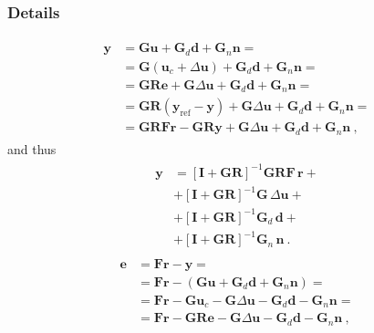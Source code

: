 \documentclass[letterpaper,10pt,english]{jupyterBook}
\begin{document}
\subsubsection*{Details}

\sphinxAtStartPar
{}
\begin{equation*}
\begin{split}\begin{aligned}
  \mathbf{y}
  & = \mathbf{G} \mathbf{u} + \mathbf{G}_d \mathbf{d} + \mathbf{G}_n \mathbf{n} = \\
  & = \mathbf{G} \left( \mathbf{u}_c + \Delta \mathbf{u} \right) + \mathbf{G}_d \mathbf{d} + \mathbf{G}_n \mathbf{n} = \\
  & = \mathbf{G} \mathbf{R} \mathbf{e} + \mathbf{G} \Delta \mathbf{u} + \mathbf{G}_d \mathbf{d} + \mathbf{G}_n \mathbf{n} = \\
  & = \mathbf{G} \mathbf{R} \left( \mathbf{y}_{\text{ref}} - \mathbf{y} \right) + \mathbf{G} \Delta \mathbf{u} + \mathbf{G}_d \mathbf{d} + \mathbf{G}_n \mathbf{n} = \\
  & = \mathbf{G} \mathbf{R} \mathbf{F} \mathbf{r} - \mathbf{G} \mathbf{R} \mathbf{y} + \mathbf{G} \Delta \mathbf{u} + \mathbf{G}_d \mathbf{d} + \mathbf{G}_n \mathbf{n} \ ,
\end{aligned}\end{split}
\end{equation*}
\sphinxAtStartPar
and thus
\begin{equation*}
\begin{split}\begin{aligned}
\mathbf{y}
  & = \left[ \mathbf{I} + \mathbf{G}\mathbf{R} \right]^{-1} \mathbf{G} \mathbf{R} \mathbf{F} \,        \mathbf{r} + \\
  & + \left[ \mathbf{I} + \mathbf{G}\mathbf{R} \right]^{-1} \mathbf{G}                       \, \Delta \mathbf{u} + \\
  & + \left[ \mathbf{I} + \mathbf{G}\mathbf{R} \right]^{-1} \mathbf{G}_d                     \,        \mathbf{d} + \\
  & + \left[ \mathbf{I} + \mathbf{G}\mathbf{R} \right]^{-1} \mathbf{G}_n                     \,        \mathbf{n} \ .
\end{aligned}\end{split}
\end{equation*}
\sphinxAtStartPar
{}
\begin{equation*}
\begin{split}\begin{aligned}
  \mathbf{e}
  & = \mathbf{F} \mathbf{r} - \mathbf{y} = \\
  & = \mathbf{F} \mathbf{r} - \left(  \mathbf{G} \mathbf{u} + \mathbf{G}_d \mathbf{d} + \mathbf{G}_n \mathbf{n} \right) = \\
  & = \mathbf{F} \mathbf{r} - \mathbf{G} \mathbf{u}_c - \mathbf{G} \Delta \mathbf{u} - \mathbf{G}_d \mathbf{d} - \mathbf{G}_n \mathbf{n} = \\
  & = \mathbf{F} \mathbf{r} - \mathbf{G} \mathbf{R} \mathbf{e} - \mathbf{G} \Delta \mathbf{u} - \mathbf{G}_d \mathbf{d} - \mathbf{G}_n \mathbf{n} \ ,
\end{aligned}\end{split}
\end{equation*}
\end{document}
